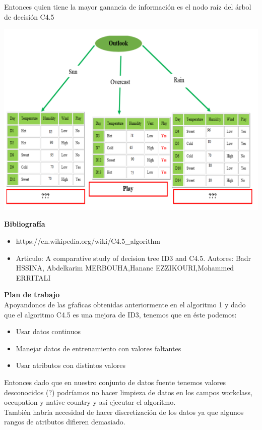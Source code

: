 \documentclass{article}
\begin{document}
Entonces quien tiene la mayor ganancia de información es el nodo raíz del árbol de decisión C4.5

\begin{center}
 \includegraphics[scale=0.7]{arbol}\\
\end{center}

{\bf Bibliografía}
\begin{itemize}
 \item https://en.wikipedia.org/wiki/C4.5\_algorithm
 \item Articulo: A comparative study of decision tree ID3 and C4.5. Autores: Badr HSSINA, Abdelkarim MERBOUHA,Hanane EZZIKOURI,Mohammed ERRITALI 
\end{itemize}


{\bf Plan de trabajo}\\

Apoyandonos de las gŕaficas obtenidas anteriormente en el algoritmo 1 y dado que el algoritmo C4.5 es una mejora de ID3, tenemos que en éste podemos:
\begin{itemize}
\item Usar datos continuos
\item Manejar datos de entrenamiento con valores faltantes
\item Usar atributos con distintos valores
\end{itemize}

Entonces dado que en nuestro conjunto de datos fuente tenemos valores desconocidos (?) podríamos no hacer limpieza de datos en los campos workclass, occupation y native-country y así ejecutar el algoritmo.\\

También habría necesidad de hacer discretización de los datos ya que algunos rangos de atributos difieren demasiado.
\end{document}
